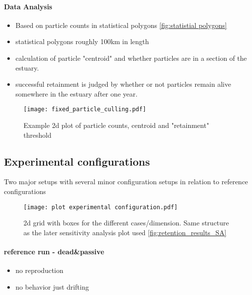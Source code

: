 \paragraph{Data Analysis}
\begin{itemize}
    \item Based on particle counts in statistical polygons \ref{fig:statistial polygons}
    \item statistical polygons roughly 100km in length
    \item calculation of particle "centroid" and whether particles are in a section of the estuary.
    \item successful retainment is judged by whether or not particles remain alive somewhere in the estuary after one year.
\end{itemize}
\begin{figure}
    \texttt{[image: fixed\_particle\_culling.pdf]}
    \caption{Example 2d plot of particle counts, centroid and "retainment" threshold}
\end{figure}

\subsection*{Experimental configurations}

Two major setups with several minor configuration setups in relation to reference configurations
\begin{figure}
    \texttt{[image: plot experimental configuration.pdf]}
    \caption{2d grid with boxes for the different cases/dimension. 
             Same structure as the later sensitivity analysis plot used \ref{fig:retention_results_SA}}
    \label{fig:experimental_configuration}
\end{figure}

\paragraph{reference run - dead\&passive}
\begin{itemize}
    \item no reproduction 
    \item no behavior just drifting
\end{itemize}

